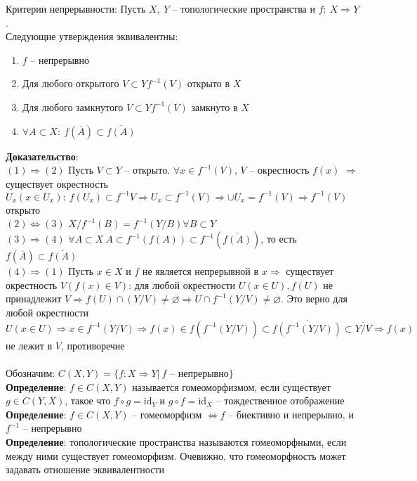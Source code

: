 	Критерии непрерывности:
	Пусть $X,\ Y$ -- топологические пространства и $f:\ X \Rightarrow Y$.\\
	Следующие утверждения эквивалентны:
	\begin{enumerate}
		\item 
		$f$ -- непрерывно
		\item 
		Для любого открытого $V\subset Y f^{-1} (V)$ открыто в $X$
		\item 
		Для любого замкнутого $V\subset Y f^{-1} (V)$ замкнуто в $X$
		\item 
		$\forall A \subset X:\ f(\overline{A}) \subset \overline{f(A)}$
	\end{enumerate}
	\textbf{Доказательство}:\\
	$(1) \Rightarrow (2)$ Пусть $V \subset Y$ -- открыто. $\forall x\in f^{-1} (V)$, $V$ -- окрестность $f(x)$ $\Rightarrow$ существует окрестность $U_x (x\in U_x):\ f(U_x) \subset f^{-1} V \Rightarrow U_x \subset f^{-1}(V) \Rightarrow \cup U_x=f^{-1} (V) \Rightarrow f^{-1}(V)$ открыто\\
	$(2) \Leftrightarrow (3)$ $X\slash f^{-1} (B) = f^{-1} (Y\slash B) \forall B\subset Y$\\
	$(3) \Rightarrow (4)$ $\forall A \subset X\ A\subset f^{-1}(f(A)) \subset f^{-1} (\overline{f(A)})$, то есть $f(\overline{A}) \subset \overline{f(A)}$\\
	$(4) \Rightarrow (1)$ Пусть $x\in X$ и $f$ не является непрерывной в $x \Rightarrow$ существует окрестность $V(f(x)\in V)$: для любой окрестности $U(x\in U), f(U)$ не принадлежит $V \Rightarrow f(U)\cap (Y\slash V) \neq \varnothing \Rightarrow U\cap f^{-1} (Y\slash V) \neq \varnothing$. Это верно для любой окрестности $U(x\in U) \Rightarrow x\in \overline{f^{-1}(Y\slash V)} \Rightarrow f(x) \in f(\overline{f^{-1}(Y\slash V)}) \subset \overline{f(f^{-1}(Y\slash V))} \subset \overline{Y\slash V} \Rightarrow f(x)$ не лежит в $V$, противоречие\\
	\\
	Обозначим: $C(X,Y) = \{f:X\Rightarrow Y|\ f \text{\ -- непрерывно} \}$\\
	\textbf{Определение}: $f\in C(X,Y)$ называется гомеоморфизмом, если существует $g\in C(Y,X)$, такое что $f\circ g = \text{id}_Y$ и $g\circ f = \text{id}_X$ -- тождественное отображение\\
	\textbf{Определение}: $f\in C(X,Y)$ -- гомеоморфизм $\Leftrightarrow f$ -- биективно и непрерывно, и $f^{-1}$ -- непрерывно\\
	\textbf{Определение}: топологические пространства называются гомеоморфными, если между ними существует гомеоморфизм. Очевижно, что гомеоморфность может задавать отношение эквивалентности\\
